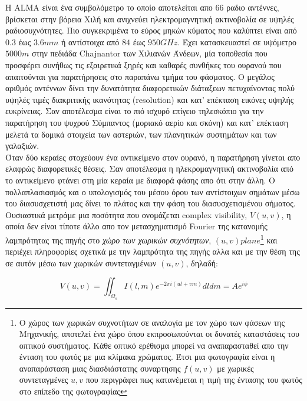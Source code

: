 \gr

Η {\en ALMA} είναι ένα συμβολόμετρο το οποίο αποτελείται απο 66 ραδιο αντέννες, βρίσκεται στην βόρεια Χιλή και ανιχνεύει ηλεκτρομαγνητική ακτινοβολία σε υψηλές ραδιοσυχνότητες. Πιο συγκεκριμένα το εύρος μηκών κύματος που καλύπτει είναι από $0.3$ έως $3.6mm$ ή αντίστοιχα από $84$ έως $950 GHz$. Έχει κατασκευαστεί σε υψόμετρο $5000m$ στην πεδιάδα {\en Chajnantor} των Χιλιανών Άνδεων, μία τοποθεσία που προσφέρει συνήθως τις εξαιρετικά ξηρές και καθαρές συνθήκες του ουρανού που απαιτούνται για παρατήρησεις στο παραπάνω τμήμα του φάσματος. Ο μεγάλος αριθμός αντέννων δίνει την δυνατότητα διαφορετικών διάταξεων πετυχαίνοντας πολύ υψηλές τιμές διακριτικής ικανότητας ({\en resolution}) και κατ' επέκταση εικόνες υψηλής ευκρίνειας. Σαν αποτέλεσμα είναι το πιό ισχυρό επίγειο τηλεσκόπιο για την παρατήρηση του ψυχρού Σύμπαντος (μοριακό αερίο και σκόνη) και κατ' επέκταση μελετά τα δομικά στοιχεία των αστεριών, των πλανητικών συστημάτων και των γαλαξιών.\\

Όταν δύο κεραίες στοχεύουν ένα αντικείμενο στον ουρανό, η παρατήρηση γίνεται απο ελαφρώς διαφορετικές θέσεις. Σαν αποτέλεσμα η ηλεκρομαγνητική ακτινοβολία από το αντικείμενο φτάνει στη μία κεραία με διαφορά φάσης απο ότι στην άλλη. Ο πολλαπλασιασμός και ο υπολογισμός του μέσου όρου των αντίστοιχων σημάτων μέσω του διασυσχετιστή μας δίνει το πλάτος και την φάση του διασυσχετισμένου σήματος. Ουσιαστικά μετράμε μια ποσότητα που ονομάζεται {\en complex visibility}, $V(u,v)$, η οποία δεν είναι τίποτε άλλο απο τον μετασχηματισμό {\en Fourier} της κατανομής λαμπρότητας της πηγής στο {\it χώρο των χωρικών συχνότητων}, $(u,v) plane$\footnote{Ο χώρος των χωρικών συχνοτήτων σε αναλογία με τον χώρο των φάσεων της Μηχανικής, αποτελεί ένα χώρο όπου εκπροσωπούνται οι δυνατές καταστάσεις του οπτικού συστήματος. Κάθε οπτικό ερέθισμα μπορεί να αναπαρασταθεί απο την ένταση του φωτός με μια κλίμακα χρώματος. Έτσι μια φωτογραφία είναι η αναπαράσταση μιας διασδιάστατης συναρτησης $f(u,v)$ με χωρικές συντεταγμένες $u,v$ που περιγράφει πως κατανέμεται η τιμή της έντασης του φωτός στο επίπεδο της φωτογραφίας} και περιέχει πληροφορίες σχετικά με την λαμπρότητα της πηγής αλλα και με την θέση της σε αυτόν μέσω των χωρικών συντεταγμένων $(u,v)$, δηλαδή:

\begin{equation}\label{ComplexVisibility}
V(u,v) = \iint_{\Omega_s} I(l,m)e^{-2\pi i(ul+vm)} dldm= Ae^{i\phi}
\end{equation}


